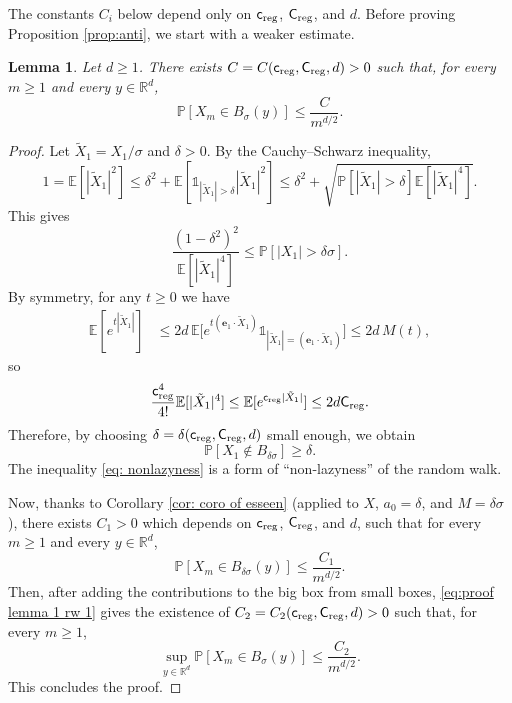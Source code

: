 \documentclass[11pt,a4paper]{article}
\numberwithin{equation}{section}
\theoremstyle{plain}
\newtheorem{Lem}[Thm]{Lemma}
\theoremstyle{definition}
\newcommand\1{\mathds{1}}
\newcommand\CM{\mathsf{C}_{\textup{reg}}}
\newcommand\cM{\mathsf{c}_{\textup{reg}}}
\newcommand\creg{\mathsf{c}_{\textup{reg}}}
\newcommand\Creg{\mathsf{C}_{\textup{reg}}}
\begin{document}
The constants $C_i$ below depend only on $\creg$, $\Creg$, and $d$. Before proving Proposition \ref{prop:anti}, we start with a weaker estimate.


\begin{Lem}\label{lem: weak anticonc} Let $d\geq 1$. There exists $C=C(\creg,\Creg,d)>0$ such that, for every $m\geq 1$ and every $y\in \mathbb R^d$,
\begin{equation}
	\mathbb P[X_m\in B_\sigma(y)]\leq \frac{C}{m^{d/2}}.
\end{equation}
\end{Lem}
\begin{proof} Let $\tilde X_1=X_1/\sigma$ and $\delta>0$. By the Cauchy--Schwarz inequality,
\begin{equation}
	1=\mathbb E[|\tilde{X}_1|^2]\leq \delta^2+\mathbb E[\mathds{1}_{|\tilde{X}_1|> \delta}|\tilde{X}_1|^2]\leq \delta^2+\sqrt{\mathbb P[|\tilde{X}_1|> \delta]\mathbb E[|\tilde{X}_1|^4]}.
\end{equation}
This gives
\begin{equation}
\frac{(1-\delta^2)^2}{\mathbb E[|\tilde{X}_1|^4]}\leq  \mathbb P[|X_1|> \delta\sigma].
\end{equation}
By symmetry,
for any $t \ge 0$ we have
 \begin{align}
 \label{eq:2dM}
    \mathbb E[ e^{t |\tilde X_1|}]
    & \le
    2d \, \mathbb E \big[e^{t (\mathbf{e}_1 \cdot\tilde  X_1)} \1_{|\tilde{X}_1|= (\mathbf{e}_1 \cdot\tilde  X_1)} \big]
    \le
    2d \, M(t),
 \end{align}
so
\begin{equation}
	\frac{\cM^4}{4!}\mathbb E[|\tilde X_1|^4]\leq \mathbb E[e^{\cM |\tilde X_1|}]
    \leq 2d\CM.
\end{equation}
Therefore, by choosing $\delta=\delta(\cM,\CM,d)$ small enough, we obtain
\begin{equation}
\label{eq: nonlazyness}
	\mathbb P[X_1\notin B_{\delta\sigma}]\geq \delta.
\end{equation}
The inequality \eqref{eq: nonlazyness} is a form of ``non-lazyness'' of the random walk.

Now, thanks to Corollary \ref{cor: coro of esseen} (applied to $X$, $a_0=\delta$, and $M=\delta\sigma$), there exists $C_1>0$ which depends on $\creg$, $\Creg$, and $d$, such that for every $m\geq 1$ and every $y\in \mathbb R^d$,
\begin{equation}\label{eq:proof lemma 1 rw 1}
	\mathbb P[X_m\in B_{\delta \sigma}(y)]\leq \frac{C_1}{m^{d/2}}.
\end{equation}
Then, after adding the contributions to the big box from small boxes, \eqref{eq:proof lemma 1 rw 1} gives the existence of $C_2=C_2(\creg,\Creg,d)>0$ such that, for every $m\geq 1$,
\begin{equation}\label{eq:proof lemma 1 rw 2}
	\sup_{y\in \mathbb R^d}\mathbb P[X_m\in B_{\sigma}(y)]\leq \frac{C_2}{m^{d/2}}.
\end{equation}
This concludes the proof.
\end{proof}
\end{document}
